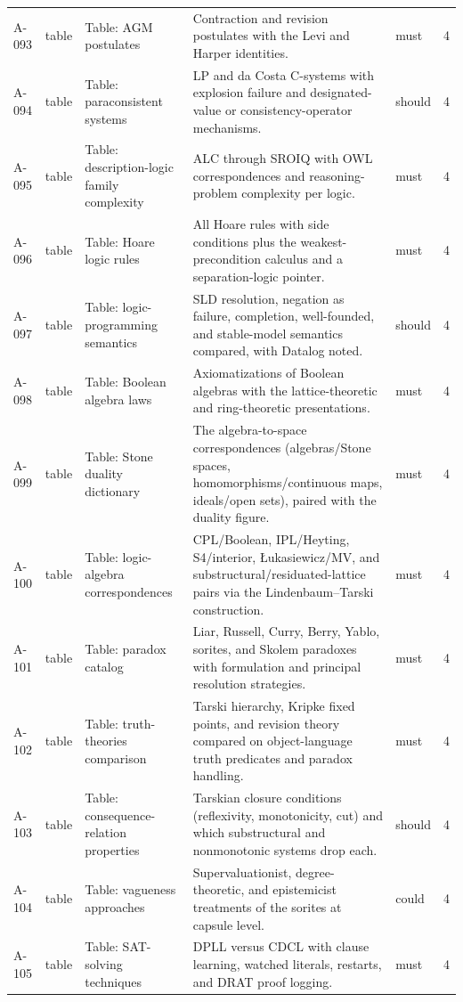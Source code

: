 \begin{longtable}{@{}p{0.45in}p{0.78in}p{2.02in}p{2.6in}p{0.42in}p{0.16in}@{}}
A-093 & table & Table: AGM postulates & Contraction and revision postulates with the Levi and Harper identities. & must & 4 \\
A-094 & table & Table: paraconsistent systems & LP and da Costa C-systems with explosion failure and designated-value or consistency-operator mechanisms. & should & 4 \\
A-095 & table & Table: description-logic family complexity & ALC through SROIQ with OWL correspondences and reasoning-problem complexity per logic. & must & 4 \\
A-096 & table & Table: Hoare logic rules & All Hoare rules with side conditions plus the weakest-precondition calculus and a separation-logic pointer. & must & 4 \\
A-097 & table & Table: logic-programming semantics & SLD resolution, negation as failure, completion, well-founded, and stable-model semantics compared, with Datalog noted. & should & 4 \\
A-098 & table & Table: Boolean algebra laws & Axiomatizations of Boolean algebras with the lattice-theoretic and ring-theoretic presentations. & must & 4 \\
A-099 & table & Table: Stone duality dictionary & The algebra-to-space correspondences (algebras/Stone spaces, homomorphisms/continuous maps, ideals/open sets), paired with the duality figure. & must & 4 \\
A-100 & table & Table: logic-algebra correspondences & CPL/Boolean, IPL/Heyting, S4/interior, {\L}ukasiewicz/MV, and substructural/residuated-lattice pairs via the Lindenbaum--Tarski construction. & must & 4 \\
A-101 & table & Table: paradox catalog & Liar, Russell, Curry, Berry, Yablo, sorites, and Skolem paradoxes with formulation and principal resolution strategies. & must & 4 \\
A-102 & table & Table: truth-theories comparison & Tarski hierarchy, Kripke fixed points, and revision theory compared on object-language truth predicates and paradox handling. & must & 4 \\
A-103 & table & Table: consequence-relation properties & Tarskian closure conditions (reflexivity, monotonicity, cut) and which substructural and nonmonotonic systems drop each. & should & 4 \\
A-104 & table & Table: vagueness approaches & Supervaluationist, degree-theoretic, and epistemicist treatments of the sorites at capsule level. & could & 4 \\
A-105 & table & Table: SAT-solving techniques & DPLL versus CDCL with clause learning, watched literals, restarts, and DRAT proof logging. & must & 4 \\

\end{longtable}
